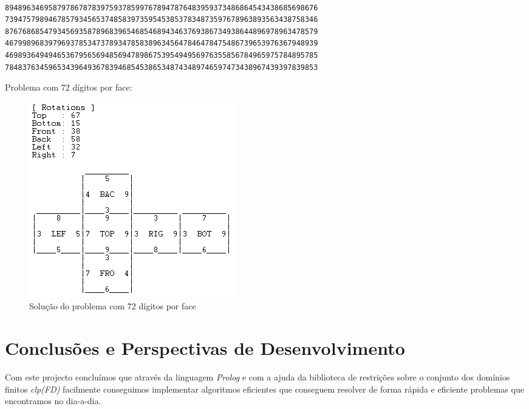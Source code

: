 \begin{f_exemplo}[H]
\begin{verbatim}

894896346958797867878397593785997678947876483959373486864543438685698676
739475798946785793456537485839735954538537834873597678963893563438758346
876768685479345693587896839654685468943463769386734938644896978963478579
467998968397969378534737893478583896345647846478475486739653976367948939
469893649494653679565694856947898675395494956976355856784965975784895785
784837634596534396493678394685453865348743489746597473438967439397839853
\end{verbatim}
\caption{Problema com 72 dígitos por face:}
\end{f_exemplo}

\begin{figure}[H]
\begin{center}
\includegraphics[scale=0.7]{ex2.png}
\caption{Solução do problema com 72 dígitos por face}
\label{fig:4}
\end{center}
\end{figure}





\section{Conclusões e Perspectivas de Desenvolvimento}
\label{concl}

Com este projecto concluímos que através da linguagem \textit{Prolog} e com a ajuda da biblioteca de restrições sobre o conjunto dos domínios finitos \textit{clp(FD)} facilmente conseguimos implementar algoritmos eficientes que conseguem resolver de forma rápida e eficiente problemas que encontramos no dia-a-dia. 

